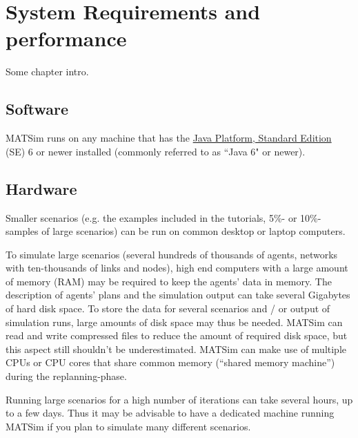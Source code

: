 \chapter{System Requirements and performance}


\bigskip

\begin{chapter-intro}
Some chapter intro.
\end{chapter-intro}

\section{Software}

MATSim runs on any machine that has the \href{http://java.sun.com/javase/downloads/index.jsp}{Java Platform, Standard Edition} (SE) 6 or newer installed (commonly referred to as ``Java 6" or newer).

\section{Hardware}

Smaller  scenarios (e.g. the examples included in the tutorials, 5\%- or  10\%-samples of large scenarios) can be run on common desktop or laptop  computers.

To simulate large scenarios (several hundreds of  thousands of agents, networks with ten-thousands of links and nodes),  high end computers with a large amount of memory (RAM) may be required  to keep the agents' data in memory. The description of agents' plans and  the simulation output can take several Gigabytes of hard disk space. To  store the data for several scenarios and / or output of simulation  runs, large amounts of disk space may thus be needed. MATSim can read  and write compressed files to reduce the amount of required disk space,  but this aspect still shouldn't be underestimated. MATSim can make use  of multiple CPUs or CPU cores that share common memory (``shared memory  machine'') during the replanning-phase.

Running large scenarios for  a high number of iterations can take several hours, up to a few days.  Thus it may be advisable to have a dedicated machine running MATSim if  you plan to simulate many different scenarios.

